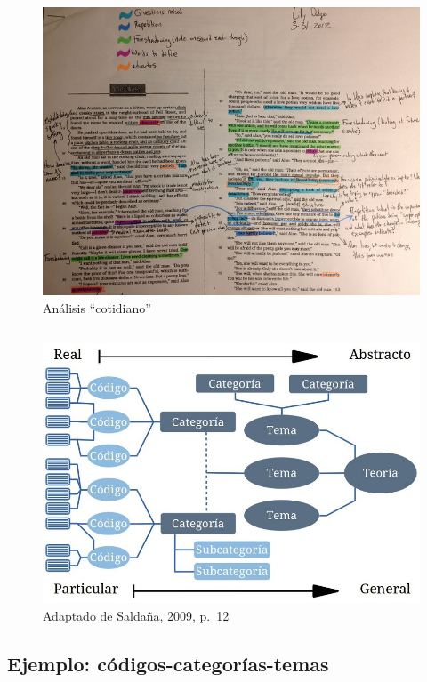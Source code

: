 \begin{figure}
\centering
\includegraphics{imagenes-cuali/AnalisisCotidiano.png}
\caption{Análisis ``cotidiano''}
\end{figure}

\hypertarget{esquema-saldana}{%
\subsection{}\label{esquema-saldana}}

\begin{figure}
\centering
\includegraphics{imagenes-cuali/DatoATeoria.jpg}
\caption{Adaptado de Saldaña, 2009, p.~12}
\end{figure}

\hypertarget{ejemplo}{%
\subsection{Ejemplo: códigos-categorías-temas}\label{ejemplo}}

